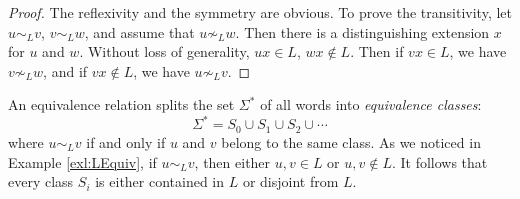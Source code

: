 

\setcounter{section}{4}
\setcounter{subsection}{1}
\setcounter{dfn}{3}

\begin{proof}
The reflexivity and the symmetry are obvious.
To prove the transitivity, let $u \sim_L v$, $v \sim_L w$, and assume that $u \not\sim_L w$.
Then there is a distinguishing extension $x$ for $u$ and $w$.
Without loss of generality, $ux \in L$, $wx \notin L$.
Then if $vx \in L$, we have $v \not\sim_L w$, and if $vx \notin L$, we have $u \not\sim_L v$.
\end{proof}

An equivalence relation splits the set $\Sigma^*$ of all words into \emph{equivalence classes}:
\begin{equation}
\label{eqn:SigmaEqClasses}
\Sigma^* = S_0 \cup S_1 \cup S_2 \cup \cdots
\end{equation}
where $u \sim_L v$ if and only if $u$ and $v$ belong to the same class.
As we noticed in Example \ref{exl:LEquiv}, if $u \sim_L v$, then either $u,v \in L$ or $u,v \notin L$.
It follows that every class $S_i$ is either contained in $L$ or disjoint from $L$.



